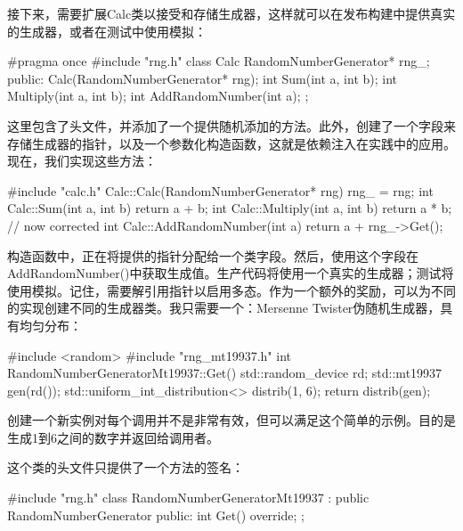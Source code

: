 接下来，需要扩展Calc类以接受和存储生成器，这样就可以在发布构建中提供真实的生成器，或者在测试中使用模拟：


\begin{cmake}
#pragma once
#include "rng.h"
class Calc {
    RandomNumberGenerator* rng_;
public:
    Calc(RandomNumberGenerator* rng);
    int Sum(int a, int b);
    int Multiply(int a, int b);
    int AddRandomNumber(int a);
};
\end{cmake}

这里包含了头文件，并添加了一个提供随机添加的方法。此外，创建了一个字段来存储生成器的指针，以及一个参数化构造函数，这就是依赖注入在实践中的应用。现在，我们实现这些方法：


\begin{cpp}
#include "calc.h"
Calc::Calc(RandomNumberGenerator* rng) {
    rng_ = rng;
}
int Calc::Sum(int a, int b) {
    return a + b;
}
int Calc::Multiply(int a, int b) {
    return a * b; // now corrected
}
int Calc::AddRandomNumber(int a) {
    return a + rng_->Get();
}
\end{cpp}

构造函数中，正在将提供的指针分配给一个类字段。然后，使用这个字段在AddRandomNumber()中获取生成值。生产代码将使用一个真实的生成器；测试将使用模拟。记住，需要解引用指针以启用多态。作为一个额外的奖励，可以为不同的实现创建不同的生成器类。我只需要一个：Mersenne Twister伪随机生成器，具有均匀分布：


\begin{cpp}
#include <random>
#include "rng_mt19937.h"
int RandomNumberGeneratorMt19937::Get() {
    std::random_device rd;
    std::mt19937 gen(rd());
    std::uniform_int_distribution<> distrib(1, 6);
    return distrib(gen);
}
\end{cpp}

创建一个新实例对每个调用并不是非常有效，但可以满足这个简单的示例。目的是生成1到6之间的数字并返回给调用者。

这个类的头文件只提供了一个方法的签名：


\begin{cpp}
#include "rng.h"
class RandomNumberGeneratorMt19937
    : public RandomNumberGenerator {
public:
    int Get() override;
};
\end{cpp}

